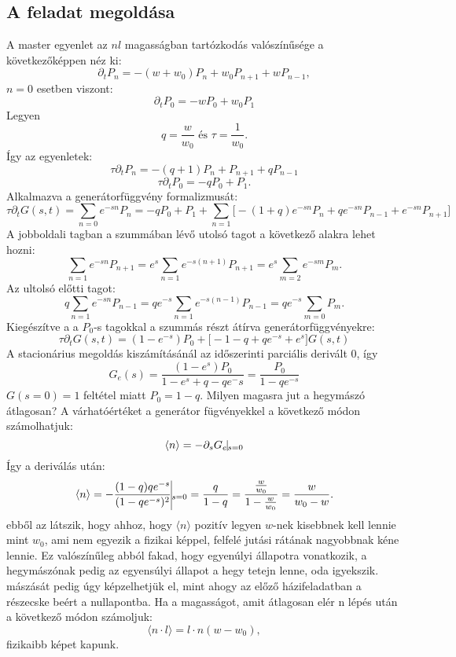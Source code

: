 \documentclass[12pt]{article}
\begin{document}
\subsection*{A feladat megoldása}
A master egyenlet az $nl$ magasságban tartózkodás valószínűsége  a következőképpen néz ki:
$$ \partial_tP_n = -(w + w_0)P_n + w_0P_{n+1} + wP_{n-1},$$
$n = 0$ esetben viszont:
$$\partial_t P_0 = -wP_0 + w_0P_1$$
Legyen
$$q = \frac{w}{w_0} \text{ és } \tau = \frac{1}{w_0} .$$
Így az egyenletek:
$$\tau \partial_t P_n = -(q+1)P_n + P_{n+1} + qP_{n-1}$$
$$ \tau \partial_t P_0 = -qP_0 + P_1.$$
Alkalmazva a generátorfüggvény formalizmusát:
$$\tau \partial _t G(s, t ) = \sum_{n = 0}e^{-sn}P_n = -qP_0 + P_1 + \sum_{n =1}\big [-(1+q)e^{-sn}P_n + qe^{-sn}P_{n-1} + e^{-sn}P_{n+1}\big]$$
A jobboldali tagban a szummában lévő utolsó tagot a következő alakra lehet hozni:
$$\sum_{n =1}e^{-sn}P_{n+1} = e^s\sum_{n = 1}e^{-s(n+1)}P_{n+1}= e^s\sum_{m = 2}e^{-sm}P_m. $$
Az ultolsó előtti tagot:
$$q\sum_{n = 1}e^{-sn}P_{n-1} = qe^{-s}\sum_{n = 1} e^{-s(n-1)}P_{n-1} = qe^{-s}\sum_{m =0}  P_m.$$
Kiegészítve a a $P_0$-s tagokkal a szummás részt átírva generátorfüggvényekre:
$$\tau \partial_tG(s,t) = (1-e^{-s})P_0+ \big [-1-q+qe^{-s}+ e^s\big ]G(s,t)$$
A stacionárius megoldás kiszámításánál az időszerinti parciális derivált 0, így 
$$G_e(s) = \frac{(1-e^s)P_0}{1-e^s+q-qe^-s} = \frac{P_0}{1-qe^{-s}}$$
$G(s = 0) = 1$ feltétel miatt $P_0 = 1-q.$  Milyen magasra jut a hegymászó átlagosan? A várhatóértéket a generátor fügvényekkel a következő módon számolhatjuk:
$$\langle n \rangle = -\partial_s G_e\vline_{s = 0}$$
Így a deriválás után:
$$\langle n\rangle = -\frac{(1-q)qe^{-s}}{(1-qe^{-s})^2}\vline_{s=0} = \frac{q}{1-q} = \frac{\frac{w}{w_0}}{1-\frac{w}{w_0}}= \frac{w}{w_0-w}.$$
ebből az látszik, hogy ahhoz, hogy $\langle n \rangle$ pozitív legyen  $w$-nek kisebbnek kell lennie mint $w_0$, ami nem egyezik a fizikai képpel, felfelé jutási rátának nagyobbnak kéne lennie. Ez valószínűleg abból fakad, hogy egyenúlyi állapotra vonatkozik, a hegymászónak pedig az egyensúlyi állapot a hegy tetejn lenne, oda igyekszik. mászását pedig úgy képzelhetjük el, mint ahogy az előző házifeladatban a részecske beért a nullapontba. Ha a magasságot, amit átlagosan elér n lépés után a következő módon számoljuk:
$$\langle n\cdot l \rangle = l\cdot n (w-w_0),$$
fizikaibb képet kapunk.
\end{document}
